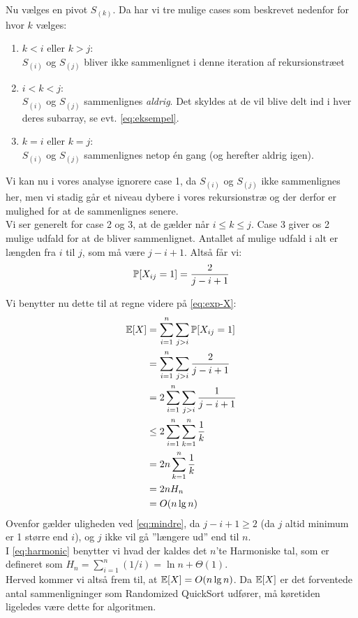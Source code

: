 Nu vælges en pivot $S_{(k)}$. Da har vi tre mulige cases som beskrevet nedenfor for hvor $k$ vælges:

\begin{enumerate}
	\item $k < i$ eller $k > j$:\\
	$S_{(i)}$ og $S_{(j)}$ bliver ikke sammenlignet i denne iteration af rekursionstræet
	\item $i < k < j$:\\
	$S_{(i)}$ og $S_{(j)}$ sammenlignes \textit{aldrig}. Det skyldes at de vil blive delt ind i hver deres subarray, se evt. \cref{eq:eksempel}.
	\item $k=i$ eller $k=j$:\\
	$S_{(i)}$ og $S_{(j)}$ sammenlignes netop én gang (og herefter aldrig igen).
\end{enumerate}

Vi kan nu i vores analyse ignorere case 1, da $S_{(i)}$ og $S_{(j)}$ ikke sammenlignes her, men vi stadig går et niveau dybere i vores rekursionstræ og der derfor er mulighed for at de sammenlignes senere.\\

Vi ser generelt for case 2 og 3, at de gælder når $i \leq k \leq j$. Case 3 giver os 2 mulige udfald for at de bliver sammenlignet. Antallet af mulige udfald i alt er længden fra $i$ til $j$, som må være $j - i + 1$. Altså får vi:
\begin{align} \label{eq:prob-xij}
\P[X_{ij} = 1] = \frac{2}{j - i + 1}
\end{align}


Vi benytter nu dette til at regne videre på \cref{eq:exp-X}:
\begin{align}
\e[X] &= \sum_{i=1}^n \sum_{j>i} \P[X_{ij} = 1] \nonumber \\
      &= \sum_{i=1}^n \sum_{j>i} \frac{2}{j - i + 1} \nonumber \\
      &= 2 \sum_{i=1}^n \sum_{j>i} \frac{1}{j - i + 1} \nonumber \\
   &\leq 2 \sum_{i=1}^n \sum_{k=1}^n \frac{1}{k} \label{eq:mindre} \\
      &= 2n \sum_{k=1}^n \frac{1}{k} \nonumber \\
      &= 2n H_n \label{eq:harmonic} \\
      &= O(n \lg n) \nonumber
\end{align}
Ovenfor gælder uligheden ved \cref{eq:mindre}, da $j-i+1 \geq 2$ (da $j$ altid minimum er 1 større end $i$), og $j$ ikke vil gå ''længere ud'' end til $n$.\\
I \cref{eq:harmonic} benytter vi hvad der kaldes det $n$'te Harmoniske tal, som er defineret som $H_n = \sum_{i=1}^n (1/i) = \ln n + \Theta(1)$.\\

Herved kommer vi altså frem til, at $\e[X] = O(n \lg n)$. Da $\e[X]$ er det forventede antal sammenligninger som Randomized QuickSort udfører, må køretiden ligeledes være dette for algoritmen.




